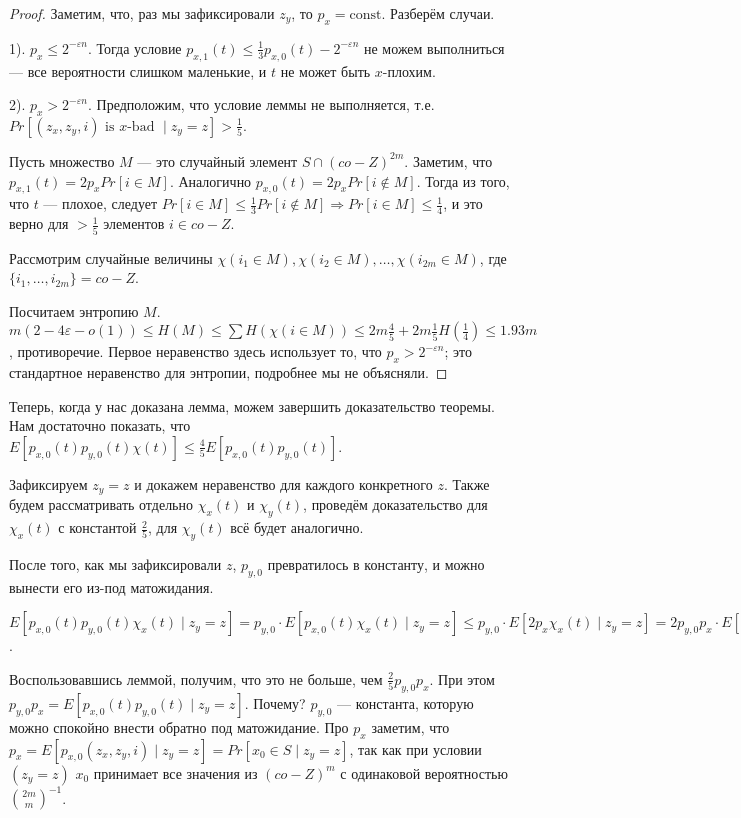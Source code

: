 \begin{proof}
Заметим, что, раз мы зафиксировали $z_y$, то $p_x = \text{const}$. Разберём случаи.

1). $p_x \leq 2^{-\varepsilon n}$. Тогда условие $p_{x, 1}(t) \leq \frac{1}{3}p_{x, 0}(t) - 2^{- \varepsilon n}$ не можем выполниться --- все вероятности слишком маленькие, и $t$ не может быть $x$-плохим.

2). $p_x > 2^{-\varepsilon n}$. Предположим, что условие леммы не выполняется, т.е. $Pr[(z_x, z_y, i) \text{ is } x\text{-bad } \mid z_y = z] > \frac{1}{5}$.

Пусть множество $M$ --- это случайный элемент $S \cap (co-Z)^{2m}$. Заметим, что $p_{x, 1}(t) = 2 p_x Pr[i \in M]$. Аналогично $p_{x, 0}(t) = 2 p_x Pr[i \notin M]$. Тогда из того, что $t$ --- плохое, следует $Pr[i \in M] \leq \frac{1}{3} Pr[i \notin M] \Rightarrow Pr[i \in M] \leq \frac{1}{4}$, и это верно для $> \frac{1}{5}$ элементов $i \in co-Z$.

Рассмотрим случайные величины $\chi(i_1 \in M), \chi(i_2 \in M), \ldots, \chi(i_{2m} \in M)$, где $\{i_1, \ldots, i_{2m}\} = co-Z$.

Посчитаем энтропию $M$. $m(2 - 4\varepsilon - o(1)) \leq H(M) \leq \sum H(\chi(i \in M)) \leq 2m \frac{4}{5} + 2m \frac{1}{5} H(\frac{1}{4})  \leq 1.93m$, противоречие. Первое неравенство здесь использует то, что $p_x > 2^{-\varepsilon n}$; это стандартное неравенство для энтропии, подробнее мы не объясняли.
\end{proof}

Теперь, когда у нас доказана лемма, можем завершить доказательство теоремы. Нам достаточно показать, что $E[p_{x, 0}(t) p_{y, 0}(t) \chi(t)] \leq \frac{4}{5}E[p_{x, 0}(t)p_{y, 0}(t)]$.

Зафиксируем $z_y = z$ и докажем неравенство для каждого конкретного $z$. Также будем рассматривать отдельно $\chi_x(t)$ и $\chi_y(t)$, проведём доказательство для $\chi_x(t)$ с константой $\frac{2}{5}$, для $\chi_y(t)$ всё будет аналогично.

После того, как мы зафиксировали $z$, $p_{y, 0}$ превратилось в константу, и можно вынести его из-под матожидания.

$E[p_{x, 0}(t)p_{y, 0}(t)\chi_x(t) \mid z_y = z] = p_{y, 0} \cdot E[p_{x, 0}(t) \chi_x(t) \mid z_y = z] \leq p_{y, 0} \cdot E[2p_{x} \chi_x(t) \mid z_y = z] = 2p_{y, 0}p_x \cdot E[\chi_x(t) \mid z_y = z]$.

Воспользовавшись леммой, получим, что это не больше, чем $\frac{2}{5} p_{y, 0}p_x$. При этом $p_{y, 0}p_x = E[p_{x, 0}(t)p_{y, 0}(t) \mid z_y = z]$. Почему? $p_{y, 0}$ --- константа, которую можно спокойно внести обратно под матожидание. Про $p_x$ заметим, что $p_x = E[p_{x, 0}(z_x, z_y, i) \mid z_y = z] = Pr[x_0 \in S \mid z_y = z]$, так как при условии $(z_y = z)$ $x_0$ принимает все значения из $(co-Z)^m$ с одинаковой вероятностью ${{2m}\choose{m}}^{-1}$.
